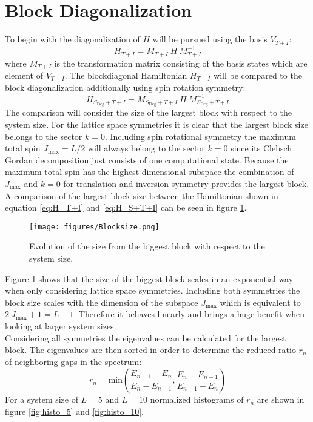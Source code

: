 \documentclass{scrartcl}
\begin{document}
\section{Block Diagonalization}
To begin with the diagonalization of $H$ will be pursued using the basis $V_{T+I}$:
\begin{equation}
    H_{T+I}=M_{T+I} \ H \ M_{T+I}^{-1}
    \label{eq:H_T+I}
\end{equation}
where $M_{T+I}$ is the transformation matrix consisting of the basis states which are element of $V_{T+I}$. The blockdiagonal Hamiltonian $H_{T+I}$ will be compared to the block diagonalization additionally using spin rotation symmetry:
\begin{equation}    H_{S_{\mathrm{Deg}}+T+I}=M_{S_{\mathrm{Deg}}+T+I} \ H \ M_{S_{\mathrm{Deg}}+T+I}^{-1}
    \label{eq:H_S+T+I}
\end{equation}
The comparison will consider the size of the largest block with respect to the system size. For the lattice space symmetries it is clear that the largest block size belongs to the sector $k=0$. Including spin rotational symmetry the maximum total spin $J_{\mathrm{max}}=L/2$ will always belong to the sector $k=0$ since its Clebsch Gordan decomposition just consists of one computational state. Because the maximum total spin has the highest dimensional subspace the combination of $J_{\mathrm{max}}$ and $k=0$ for translation and inversion symmetry provides the largest block. A comparison of the largest block size between the Hamiltonian shown in equation \ref{eq:H_T+I} and \ref{eq:H_S+T+I} can be seen in figure \ref{fig:blocksize}.

\begin{figure}[htbp]
    \centering
    \texttt{[image: figures/Blocksize.png]}
    \caption{Evolution of the size from the biggest block with respect to the system size.}
    \label{fig:blocksize}
\end{figure}
\FloatBarrier
\noindent Figure \ref{fig:blocksize} shows that the size of the biggest block scales in an exponential way when only considering lattice space symmetries. Including both symmetries the block size scales with the dimension of the subspace $J_{\mathrm{max}}$ which is equivalent to $2 \ J_{\mathrm{max}}+1=L+1$. Therefore it behaves linearly and brings a huge benefit when looking at larger system sizes.\\

Considering all symmetries the eigenvalues can be calculated for the largest block. The eigenvalues are then sorted in order to determine the reduced ratio $r_n$ of neighboring gaps in the spectrum:
\begin{equation}
    r_n=\mathrm{min} \left( \frac{E_{n+1}-E_n}{E_n-E_{n-1}}, \frac{E_n-E_{n-1}}{E_{n+1}-E_n} \right)
\end{equation}
For a system size of $L=5$ and $L=10$ normalized histograms of $r_n$ are shown in figure \ref{fig:histo_5} and \ref{fig:histo_10}.
\end{document}
